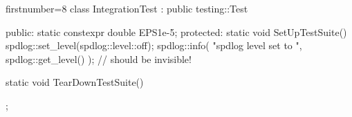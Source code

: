 \begin{cppcode*}{firstnumber=8}
class IntegrationTest : public testing::Test {
public:
  static constexpr double EPS{1e-5};
protected:
  static void SetUpTestSuite() {
    spdlog::set_level(spdlog::level::off);
    spdlog::info(
      "spdlog level set to {}", 
      spdlog::get_level()
    ); // should be invisible!
  }

  static void TearDownTestSuite() { }
};
\end{cppcode*}
